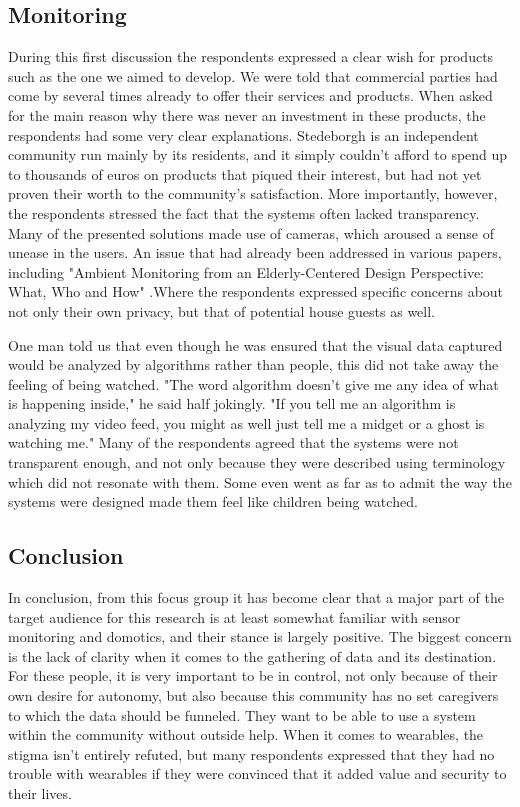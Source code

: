 \documentclass{below-ext}
\begin{document}
\subsection{Monitoring}
During this first discussion the respondents expressed a clear wish for products such as the one we aimed to develop. We were told that commercial parties had come by several times already to offer their services and products. When asked for the main reason why there was never an investment in these products, the respondents had some very clear explanations. Stedeborgh is an independent community run mainly by its residents, and it simply couldn't afford to spend up to thousands of euros on products that piqued their interest, but had not yet proven their worth to the community's satisfaction. More importantly, however, the respondents stressed the fact that the systems often lacked transparency. Many of the presented solutions made use of cameras, which aroused a sense of unease in the users. An issue that had already been addressed in various papers, including "Ambient Monitoring from an Elderly-Centered Design Perspective: What, Who and How" \cite{Kanis:2011:AME:2177525.2177579}.Where the respondents expressed specific concerns about not only their own privacy, but that of potential house guests as well.

One man told us that even though he was ensured that the visual data captured would be analyzed by algorithms rather than people, this did not take away the feeling of being watched. "The word algorithm doesn't give me any idea of what is happening inside," he said half jokingly. "If you tell me an algorithm is analyzing my video feed, you might as well just tell me a midget or a ghost is watching me." Many of the respondents agreed that the systems were not transparent enough, and not only because they were described using terminology which did not resonate with them. Some even went as far as to admit the way the systems were designed made them feel like children being watched. 

\subsection{Conclusion}
In conclusion, from this focus group it has become clear that a major part of the target audience for this research is at least somewhat familiar with sensor monitoring and domotics, and their stance is largely positive. The biggest concern is the lack of clarity when it comes to the gathering of data and its destination. For these people, it is very important to be in control, not only because of their own desire for autonomy, but also because this community has no set caregivers to which the data should be funneled. They want to be able to use a system within the community without outside help. When it comes to wearables, the stigma isn't entirely refuted, but many respondents expressed that they had no trouble with wearables if they were convinced that it  added value and security to their lives. 
\end{document}
